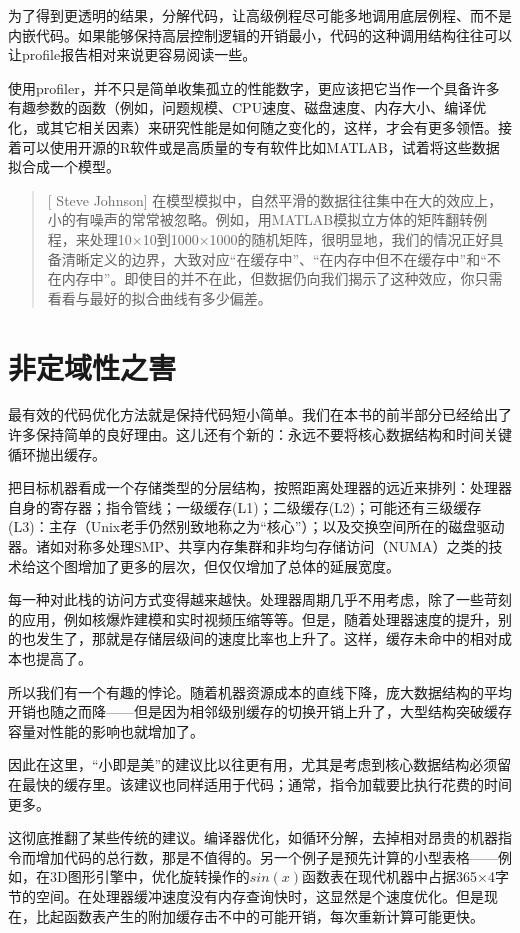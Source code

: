 \documentclass[12pt,oneside]{book}
\begin{document}
为了得到更透明的结果，分解代码，让高级例程尽可能多地调用底层例程、而不是内嵌代码。如果能够保持高层控制逻辑的开销最小，代码的这种调用结构往往可以让profile报告相对来说更容易阅读一些。

使用profiler，并不只是简单收集孤立的性能数字，更应该把它当作一个具备许多有趣参数的函数（例如，问题规模、CPU速度、磁盘速度、内存大小、编译优化，或其它相关因素）来研究性能是如何随之变化的，这样，才会有更多领悟。接着可以使用开源的R软件或是高质量的专有软件比如MATLAB，试着将这些数据拟合成一个模型。

\begin{quote}[ Steve Johnson]
在模型模拟中，自然平滑的数据往往集中在大的效应上，小的有噪声的常常被忽略。例如，用MATLAB模拟立方体的矩阵翻转例程，来处理10×10到1000×1000的随机矩阵，很明显地，我们的情况正好具备清晰定义的边界，大致对应“在缓存中”、“在内存中但不在缓存中”和“不在内存中”。即使目的并不在此，但数据仍向我们揭示了这种效应，你只需看看与最好的拟合曲线有多少偏差。
\end{quote}

\section{非定域性之害}
最有效的代码优化方法就是保持代码短小简单。我们在本书的前半部分已经给出了许多保持简单的良好理由。这儿还有个新的：永远不要将核心数据结构和时间关键循环抛出缓存。

把目标机器看成一个存储类型的分层结构，按照距离处理器的远近来排列：处理器自身的寄存器；指令管线；一级缓存(L1)；二级缓存(L2)；可能还有三级缓存(L3)：主存（Unix老手仍然别致地称之为“核心”）；以及交换空间所在的磁盘驱动器。诸如对称多处理SMP、共享内存集群和非均匀存储访问（NUMA）之类的技术给这个图增加了更多的层次，但仅仅增加了总体的延展宽度。

每一种对此栈的访问方式变得越来越快。处理器周期几乎不用考虑，除了一些苛刻的应用，例如核爆炸建模和实时视频压缩等等。但是，随着处理器速度的提升，别的也发生了，那就是存储层级间的速度比率也上升了。这样，缓存未命中的相对成本也提高了。

所以我们有一个有趣的悖论。随着机器资源成本的直线下降，庞大数据结构的平均开销也随之而降——但是因为相邻级别缓存的切换开销上升了，大型结构突破缓存容量对性能的影响也就增加了。

因此在这里，“小即是美”的建议比以往更有用，尤其是考虑到核心数据结构必须留在最快的缓存里。该建议也同样适用于代码；通常，指令加载要比执行花费的时间更多。

这彻底推翻了某些传统的建议。编译器优化，如循环分解，去掉相对昂贵的机器指令而增加代码的总行数，那是不值得的。另一个例子是预先计算的小型表格——例如，在3D图形引擎中，优化旋转操作的$ sin(x) $函数表在现代机器中占据365×4字节的空间。在处理器缓冲速度没有内存查询快时，这显然是个速度优化。但是现在，比起函数表产生的附加缓存击不中的可能开销，每次重新计算可能更快。
\end{document}
